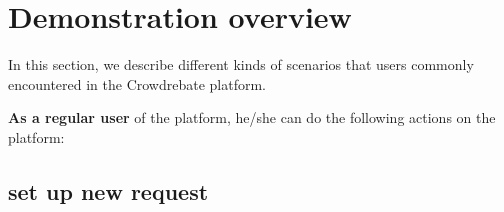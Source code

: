 \section{Demonstration overview}

In this section, we describe different kinds of scenarios that users commonly encountered in the Crowdrebate platform.

\textbf{As a regular user} of the platform, he/she can do the following actions on the platform:

\subsection{set up new request}

\begin{figure}[t!] \vspace{-1ex}
\end{figure}
